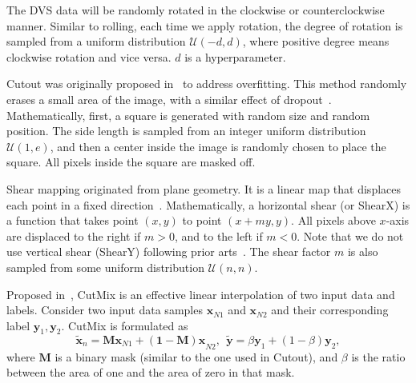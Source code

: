 \documentclass[runningheads]{llncs}
\newcommand{\bftab}{\fontseries{b}\selectfont}
\begin{document}
\noindent{\bftab Rotation.} The DVS data will be randomly rotated in the clockwise or counterclockwise manner. Similar to rolling, each time we apply rotation, the degree of rotation is sampled from a uniform distribution $\mathcal{U}(-d, d)$, where positive degree means clockwise rotation and vice versa. $d$ is a hyperparameter.

\noindent{\bftab Cutout.} Cutout was originally proposed in~\cite{devries2017cutout} to address overfitting. This method randomly erases a small area of the image, with a similar effect of dropout~\cite{srivastava2014dropout}. Mathematically, first, a square is generated with random size and random position. The side length is sampled from an integer uniform distribution $\mathcal{U}(1, e)$, and then a center inside the image is randomly chosen to place the square. All pixels inside the square are masked off. 

\noindent{\bftab Shear.} Shear mapping originated from plane geometry. It is a linear map that displaces each point in a fixed direction~\cite{Shearmapping}. Mathematically, a horizontal shear (or ShearX) is a function that takes point $(x, y)$ to point $(x+my,y)$. All pixels above $x$-axis are displaced to the right if $m>0$, and to the left if $m<0$. Note that we do not use vertical shear (ShearY) following prior arts~\cite{cubuk2018autoaugment,cubuk2020randaugment}. The shear factor $m$ is also sampled from some uniform distribution $\mathcal{U}(n, n)$.

\noindent{\bftab CutMix.} Proposed in~\cite{yun2019cutmix}, CutMix is an effective linear interpolation of two input data and labels. Consider two input data samples $\bm{x}_{N1}$ and $\bm{x}_{N2}$ and their corresponding label $\bm{y}_1,\bm{y}_2$. CutMix is formulated as
\begin{equation}
    \tilde{\bm{x}}_n = \bm{Mx}_{N1}+\bm{(1-M)x}_{N2},\ \  \tilde{\bm{y}} = \beta\bm{y}_1 + (1-\beta)\bm{y}_2,
\end{equation}
where $\bm{M}$ is a binary mask (similar to the one used in Cutout), and $\beta$ is the ratio between the area of one and the area of zero in that mask.  
\end{document}
